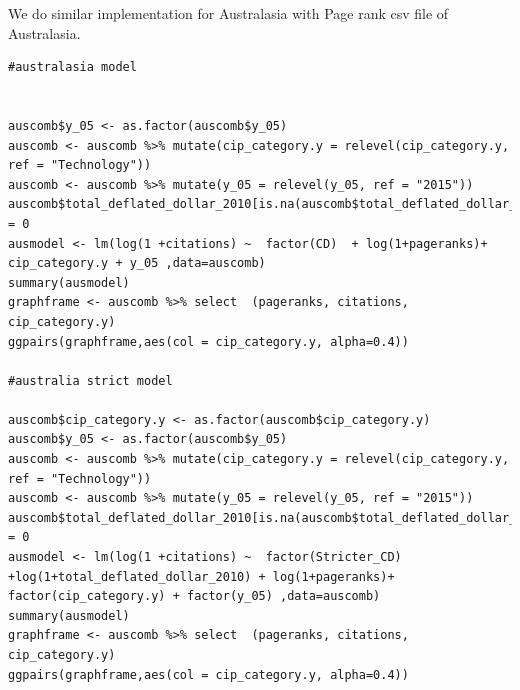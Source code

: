 \documentclass[a4paper,11pt]{article}
\theoremstyle{mytheor}
\begin{document}

We do similar implementation for Australasia with Page rank csv file of Australasia.

\begin{lstlisting}
#australasia model


auscomb$y_05 <- as.factor(auscomb$y_05)
auscomb <- auscomb %>% mutate(cip_category.y = relevel(cip_category.y, ref = "Technology"))
auscomb <- auscomb %>% mutate(y_05 = relevel(y_05, ref = "2015"))
auscomb$total_deflated_dollar_2010[is.na(auscomb$total_deflated_dollar_2010)] = 0
ausmodel <- lm(log(1 +citations) ~  factor(CD)  + log(1+pageranks)+  cip_category.y + y_05 ,data=auscomb)
summary(ausmodel)
graphframe <- auscomb %>% select  (pageranks, citations, cip_category.y) 
ggpairs(graphframe,aes(col = cip_category.y, alpha=0.4))

#australia strict model

auscomb$cip_category.y <- as.factor(auscomb$cip_category.y)
auscomb$y_05 <- as.factor(auscomb$y_05)
auscomb <- auscomb %>% mutate(cip_category.y = relevel(cip_category.y, ref = "Technology"))
auscomb <- auscomb %>% mutate(y_05 = relevel(y_05, ref = "2015"))
auscomb$total_deflated_dollar_2010[is.na(auscomb$total_deflated_dollar_2010)] = 0
ausmodel <- lm(log(1 +citations) ~  factor(Stricter_CD) +log(1+total_deflated_dollar_2010) + log(1+pageranks)+  factor(cip_category.y) + factor(y_05) ,data=auscomb)
summary(ausmodel)
graphframe <- auscomb %>% select  (pageranks, citations, cip_category.y) 
ggpairs(graphframe,aes(col = cip_category.y, alpha=0.4))
\end{lstlisting}
\end{document}
